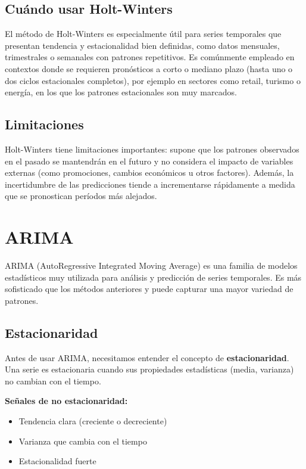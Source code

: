 \documentclass[12pt]{article}
\begin{document}
\subsection{Cuándo usar Holt-Winters}

El método de Holt-Winters es especialmente útil para series temporales que presentan tendencia y estacionalidad bien definidas, como datos mensuales, trimestrales o semanales con patrones repetitivos. Es comúnmente empleado en contextos donde se requieren pronósticos a corto o mediano plazo (hasta uno o dos ciclos estacionales completos), por ejemplo en sectores como retail, turismo o energía, en los que los patrones estacionales son muy marcados.

\subsection{Limitaciones}

Holt-Winters tiene limitaciones importantes: supone que los patrones observados en el pasado se mantendrán en el futuro y no considera el impacto de variables externas (como promociones, cambios económicos u otros factores). Además, la incertidumbre de las predicciones tiende a incrementarse rápidamente a medida que se pronostican períodos más alejados.

\section{ARIMA}

ARIMA (AutoRegressive Integrated Moving Average) es una familia de modelos estadísticos muy utilizada para análisis y predicción de series temporales. Es más sofisticado que los métodos anteriores y puede capturar una mayor variedad de patrones.

\subsection{Estacionaridad}

Antes de usar ARIMA, necesitamos entender el concepto de \textbf{estacionaridad}. Una serie es estacionaria cuando sus propiedades estadísticas (media, varianza) no cambian con el tiempo.

\vspace{0.5em}

\textbf{Señales de no estacionaridad:}
\begin{itemize}
    \item Tendencia clara (creciente o decreciente)
    \item Varianza que cambia con el tiempo
    \item Estacionalidad fuerte
\end{itemize}
\end{document}
